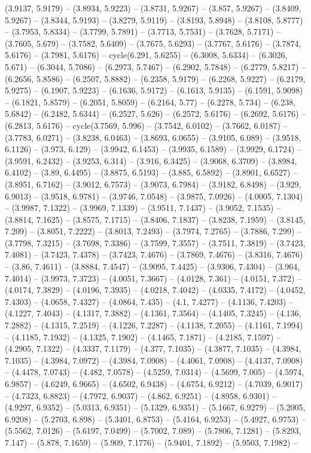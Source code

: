 (3.9137, 5.9179) -- (3.8934, 5.9223) -- (3.8731, 5.9267) -- (3.857, 5.9267) -- (3.8409, 5.9267) -- (3.8344, 5.9193) -- (3.8279, 5.9119) -- (3.8193, 5.8948) -- (3.8108, 5.8777) -- (3.7953, 5.8334) -- (3.7799, 5.7891) -- (3.7713, 5.7531) -- (3.7628, 5.7171) -- (3.7605, 5.679) -- (3.7582, 5.6409) -- (3.7675, 5.6293) -- (3.7767, 5.6176) -- (3.7874, 5.6176) -- (3.7981, 5.6176) -- cycle(6.291, 5.6255) -- (6.3008, 5.6334) -- (6.3026, 5.671) -- (6.3044, 5.7086) -- (6.2973, 5.7467) -- (6.2902, 5.7848) -- (6.2779, 5.8217) -- (6.2656, 5.8586) -- (6.2507, 5.8882) -- (6.2358, 5.9179) -- (6.2268, 5.9227) -- (6.2179, 5.9275) -- (6.1907, 5.9223) -- (6.1636, 5.9172) -- (6.1613, 5.9135) -- (6.1591, 5.9098) -- (6.1821, 5.8579) -- (6.2051, 5.8059) -- (6.2164, 5.77) -- (6.2278, 5.734) -- (6.238, 5.6842) -- (6.2482, 5.6344) -- (6.2527, 5.626) -- (6.2572, 5.6176) -- (6.2692, 5.6176) -- (6.2813, 5.6176) -- cycle(3.7569, 5.996) -- (3.7542, 6.0102) -- (3.7662, 6.0187) -- (3.7783, 6.0271) -- (3.8238, 6.0463) -- (3.8693, 6.0655) -- (3.9105, 6.089) -- (3.9518, 6.1126) -- (3.973, 6.129) -- (3.9942, 6.1453) -- (3.9935, 6.1589) -- (3.9929, 6.1724) -- (3.9591, 6.2432) -- (3.9253, 6.314) -- (3.916, 6.3425) -- (3.9068, 6.3709) -- (3.8984, 6.4102) -- (3.89, 6.4495) -- (3.8875, 6.5193) -- (3.885, 6.5892) -- (3.8901, 6.6527) -- (3.8951, 6.7162) -- (3.9012, 6.7573) -- (3.9073, 6.7984) -- (3.9182, 6.8498) -- (3.929, 6.9013) -- (3.9518, 6.9781) -- (3.9746, 7.0548) -- (3.9875, 7.0926) -- (4.0005, 7.1304) -- (3.9987, 7.1322) -- (3.9969, 7.1339) -- (3.9511, 7.1437) -- (3.9052, 7.1535) -- (3.8814, 7.1625) -- (3.8575, 7.1715) -- (3.8406, 7.1837) -- (3.8238, 7.1959) -- (3.8145, 7.209) -- (3.8051, 7.2222) -- (3.8013, 7.2493) -- (3.7974, 7.2765) -- (3.7886, 7.299) -- (3.7798, 7.3215) -- (3.7698, 7.3386) -- (3.7599, 7.3557) -- (3.7511, 7.3819) -- (3.7423, 7.4081) -- (3.7423, 7.4378) -- (3.7423, 7.4676) -- (3.7869, 7.4676) -- (3.8316, 7.4676) -- (3.86, 7.4611) -- (3.8884, 7.4547) -- (3.9095, 7.4425) -- (3.9306, 7.4304) -- (3.964, 7.4014) -- (3.9973, 7.3723) -- (4.0051, 7.3667) -- (4.0128, 7.361) -- (4.0151, 7.372) -- (4.0174, 7.3829) -- (4.0196, 7.3935) -- (4.0218, 7.4042) -- (4.0335, 7.4172) -- (4.0452, 7.4303) -- (4.0658, 7.4327) -- (4.0864, 7.435) -- (4.1, 7.4277) -- (4.1136, 7.4203) -- (4.1227, 7.4043) -- (4.1317, 7.3882) -- (4.1361, 7.3564) -- (4.1405, 7.3245) -- (4.136, 7.2882) -- (4.1315, 7.2519) -- (4.1226, 7.2287) -- (4.1138, 7.2055) -- (4.1161, 7.1994) -- (4.1185, 7.1932) -- (4.1325, 7.1902) -- (4.1465, 7.1871) -- (4.2185, 7.1597) -- (4.2905, 7.1322) -- (4.3337, 7.1179) -- (4.377, 7.1035) -- (4.3877, 7.1035) -- (4.3984, 7.1035) -- (4.3984, 7.0972) -- (4.3984, 7.0908) -- (4.4061, 7.0908) -- (4.4137, 7.0908) -- (4.4478, 7.0743) -- (4.482, 7.0578) -- (4.5259, 7.0314) -- (4.5699, 7.005) -- (4.5974, 6.9857) -- (4.6249, 6.9665) -- (4.6502, 6.9438) -- (4.6754, 6.9212) -- (4.7039, 6.9017) -- (4.7323, 6.8823) -- (4.7972, 6.9037) -- (4.862, 6.9251) -- (4.8958, 6.9301) -- (4.9297, 6.9352) -- (5.0313, 6.9351) -- (5.1329, 6.9351) -- (5.1667, 6.9279) -- (5.2005, 6.9208) -- (5.2703, 6.898) -- (5.3401, 6.8753) -- (5.4164, 6.9253) -- (5.4927, 6.9753) -- (5.5562, 7.0126) -- (5.6197, 7.0499) -- (5.7002, 7.089) -- (5.7806, 7.1281) -- (5.8293, 7.147) -- (5.878, 7.1659) -- (5.909, 7.1776) -- (5.9401, 7.1892) -- (5.9503, 7.1982) -- 